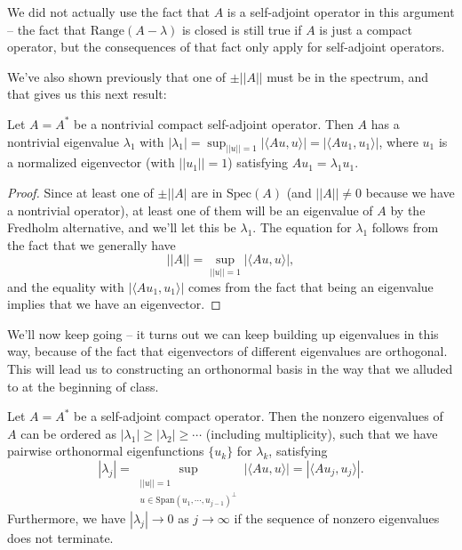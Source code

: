 \begin{remark}
We did not actually use the fact that $A$ is a self-adjoint operator in this argument -- the fact that $\text{Range}(A - \lambda)$ is closed is still true if $A$ is just a compact operator, but the consequences of that fact only apply for self-adjoint operators. 
\end{remark}

We've also shown previously that one of $\pm ||A||$ must be in the spectrum, and that gives us this next result:

\begin{theorem}
Let $A = A^\ast$ be a nontrivial compact self-adjoint operator. Then $A$ has a nontrivial eigenvalue $\lambda_1$ with $|\lambda_1| = \sup_{||u|| = 1} |\langle Au, u \rangle| = |\langle Au_1, u_1 \rangle|$, where $u_1$ is a normalized eigenvector (with $||u_1|| = 1$) satisfying $Au_1 = \lambda_1 u_1$.
\end{theorem}
\begin{proof}
Since at least one of $\pm ||A|$ are in $\text{Spec}(A)$ (and $||A|| \ne 0$ because we have a nontrivial operator), at least one of them will be an eigenvalue of $A$ by the Fredholm alternative, and we'll let this be $\lambda_1$. The equation for $\lambda_1$ follows from the fact that we generally have
\[
    ||A|| = \sup_{||u|| = 1} |\langle Au, u \rangle|,
\] 
and the equality with $|\langle Au_1, u_1 \rangle|$ comes from the fact that being an eigenvalue implies that we have an eigenvector. 
\end{proof}

We'll now keep going -- it turns out we can keep building up eigenvalues in this way, because of the fact that eigenvectors of different eigenvalues are orthogonal. This will lead us to constructing an orthonormal basis in the way that we alluded to at the beginning of class.

\begin{theorem}
Let $A = A^\ast$ be a self-adjoint compact operator. Then the nonzero eigenvalues of $A$ can be ordered as $|\lambda_1| \ge |\lambda_2| \ge \cdots$ (including multiplicity), such that we have pairwise orthonormal eigenfunctions $\{u_k\}$ for $\lambda_k$, satisfying 
\[
    |\lambda_j| = \sup_{\substack{||u|| = 1 \\ u \in \text{Span}(u_1, \cdots, u_{j-1})^\perp}} |\langle Au, u \rangle| = |\langle Au_j, u_j \rangle|.
\]
Furthermore, we have $|\lambda_j| \to 0$ as $j \to \infty$ if the sequence of nonzero eigenvalues does not terminate.
\end{theorem}

